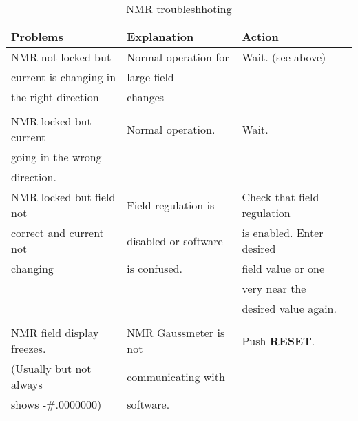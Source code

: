 \begin{table}[ht]
\begin{center}
\begin{tabular}{|l|l|l|}\hline
Problems & Explanation & Action \\ \hline
NMR not locked but  & Normal operation for  & Wait. (see 
above) \\ 
current is changing in & large field & \\ 
the right direction & changes  & \\
 && \\ \hline
NMR locked but current & Normal operation. & Wait. \\
going in the wrong & & \\
direction. & & \\ \hline
NMR locked but field not & Field regulation is & Check 
that field regulation \\
correct and current not & disabled  or software & is enabled.  Enter 
desired \\
changing & is confused. & field value or one \\
&& very near the \\
&& desired value again. \\ 
  &  & \\
\hline
NMR field display freezes. & NMR Gaussmeter is not & Push {\bf RESET}. \\
(Usually but not always & communicating with &  \\
shows  -\#.0000000) & software. & \\ \hline
\end{tabular}
\end{center}
\caption[NMR troubleshhoting]{NMR troubleshhoting
}
\label{tab:hrs_nmr_2}
\end{table}

